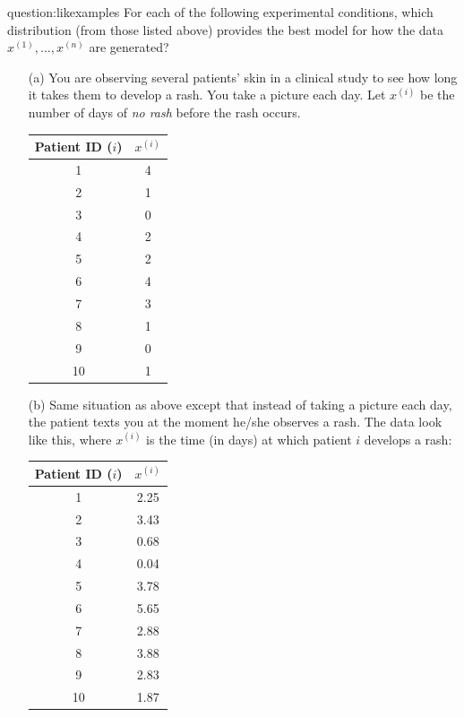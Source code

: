 \begin{question}{question:likexamples}
For each of the following experimental conditions, which distribution (from those listed above) provides the best model for how the data $x^{(1)},\dots,x^{(n)}$ are generated?
    \begin{enumerate}
    \item[(a)] You are observing several patients' skin in a clinical study to see how long it takes them to develop a rash. You take a picture each day. Let $x^{(i)}$ be the number of days of \emph{no rash} before the rash occurs.

\begin{center}{\small
\begin{tabular}{cc}
\toprule
Patient ID ($i$) & $x^{(i)}$ \\
\midrule
1 & 4 \\
2 & 1 \\
3 & 0 \\
4 & 2 \\
5 & 2 \\
6 & 4 \\
7 & 3 \\
8 & 1 \\
9 & 0 \\
10 & 1 \\
\end{tabular}}
\end{center}

    \item[(b)] Same situation as above except that instead of taking a picture each day, the patient texts you at the moment he/she observes a rash. The data look like this, where $x^{(i)}$ is the time (in days) at which patient $i$ develops a rash: 

\begin{center}{\small
\begin{tabular}{cc}
\toprule
Patient ID ($i$) & $x^{(i)}$ \\
\midrule
1 & 2.25 \\
2 & 3.43\\
3 & 0.68\\
4 & 0.04\\
5 & 3.78\\
6 & 5.65\\
7 & 2.88\\
8 & 3.88\\
9 & 2.83\\
10 & 1.87\\
\end{tabular}}
\end{center}
 

\end{enumerate}
\end{question}
